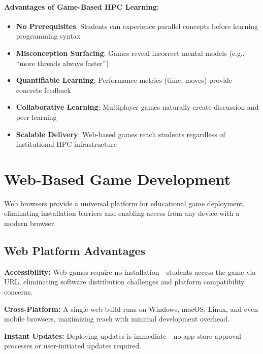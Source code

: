 \paragraph*{Advantages of Game-Based HPC Learning:}

\begin{itemize}
    \item \textbf{No Prerequisites}: Students can experience parallel concepts before learning programming syntax
    \item \textbf{Misconception Surfacing}: Games reveal incorrect mental models (e.g., ``more threads always faster'')
    \item \textbf{Quantifiable Learning}: Performance metrics (time, moves) provide concrete feedback
    \item \textbf{Collaborative Learning}: Multiplayer games naturally create discussion and peer learning
    \item \textbf{Scalable Delivery}: Web-based games reach students regardless of institutional HPC infrastructure
\end{itemize}

\section{Web-Based Game Development}
\label{sec:web-game-dev}

Web browsers provide a universal platform for educational game deployment, eliminating installation barriers and enabling access from any device with a modern browser.

\subsection{Web Platform Advantages}
\label{subsec:web-advantages}

\textbf{Accessibility:} Web games require no installation—students access the game via URL, eliminating software distribution challenges and platform compatibility concerns.

\textbf{Cross-Platform:} A single web build runs on Windows, macOS, Linux, and even mobile browsers, maximizing reach with minimal development overhead.

\textbf{Instant Updates:} Deploying updates is immediate—no app store approval processes or user-initiated updates required.


